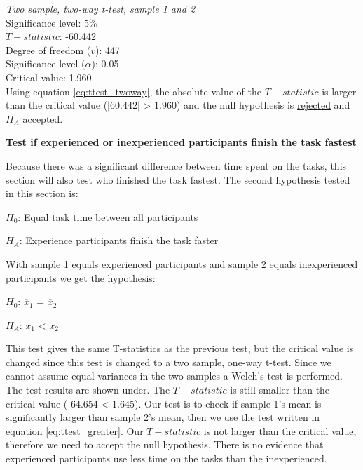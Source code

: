  \begin{center}
	\begin{tcolorbox}[width=0.8\textwidth]
		\centering
		\textit{Two sample, two-way t-test, sample 1 and 2}\\
		Significance level: 5\%  \\[0.5cm]
		
		$T-statistic$: -60.442 \\
		Degree of freedom ($v$): 447 \\ %
		Significance level ($\alpha$): 0.05 \\
		Critical value: 1.960\\[0.2cm]
		
		Using equation \ref{eq:ttest_twoway}, the absolute value of the $T-statistic$ is larger than the critical value ($|60.442|$ > $1.960$) and the null hypothesis is \underline{rejected} and $H_A$ accepted.\\[0.5cm]

	\end{tcolorbox} 
\end{center}

\vspace{0.5cm}

\textbf{Test if experienced or inexperienced participants finish the task fastest} 

Because there was a significant difference between time spent on the tasks, this section will also test who finished the task fastest. The second hypothesis tested in this section is:\newline

\centerline{$H_{0}$: Equal task time between all participants}
\centerline{$H_{A}$: Experience participants finish the task faster}

With sample 1 equals experienced participants and sample 2 equals inexperienced participants we get the hypothesis:\\[0.2cm]

\centerline{$H_{0}$: $\overline{x}_1$ = $\overline{x}_2$}
\centerline{$H_{A}$: $\overline{x}_1$ < $\overline{x}_2$}

This test gives the same T-statistics as the previous test, but the critical value is changed since this test is changed to a two sample, one-way t-test. Since we cannot assume equal variances in the two samples a Welch's test is performed. The test results are shown under. The $T-statistic$ is still smaller than the critical value (-64.654 < 1.645). Our test is to check if sample 1's mean is significantly larger than sample 2's mean, then we use the test written in equation \ref{eq:ttest_greater}. Our $T-statistic$ is not larger than the critical value, therefore we need to accept the null hypothesis. There is no evidence that experienced participants use less time on the tasks than the inexperienced. \\[0.2cm]

